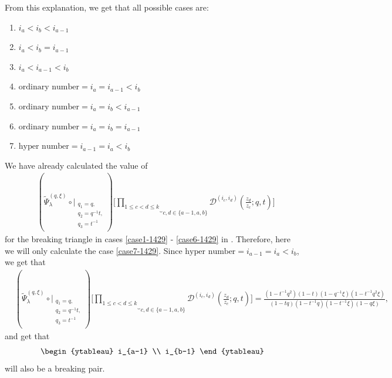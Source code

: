 \documentclass[12pt,reqno,a4paper]{amsart}
\newcommand{\comp}{\circ}
\newcommand{\cals}[1]{\mathcal{#1}}
\numberwithin{equation}{section}
\newcommand{\dualmap}{
\widetilde{\Psi}^{(q,\xi)}_{\lambda}
}
\theoremstyle{definition}
\begin{document}
From this explanation, we get that all possible cases are:
\begin{enumerate}[(1)]
	\item \label{case1-1429}$i_a < i_b < i_{a-1}$
	\item  \label{case2-1429} $i_a< i_b = i_{a-1}$
	\item  \label{case3-1429}$i_a < i_{a-1} < i_b$
	\item  \label{case4-1429}$\text{ordinary number} = i_a = i_{a-1} < i_b$
	\item  \label{case5-1429}$\text{ordinary number} = i_a = i_b < i_{a-1}$
	\item  \label{case6-1429}$\text{ordinary number} = i_a = i_b = i_{a-1}$
	\item \label{case7-1429} $\text{hyper number} = i_{a-1} = i_a < i_b$
\end{enumerate}
We have already calculated the value of 
\begin{align}
	&(
	\dualmap
	\comp 
	\bigg|_{
		\substack{
			q_1 = q, \\
			q_2 = q^{-1}t,\\
			q_3 = t^{-1} \\
		}
	}
	)
	\Bigg[
	\underbrace{		\prod_{1 \leq c < d \leq k}			}_{c,d \in \{a-1,a,b\}}
	\cals{D}^{(i_c,i_d)}\left(
	\frac{z_d}{z_c}
	; q, t
	\right)
	\Bigg]
\end{align}
for the breaking triangle in cases \ref{case1-1429} - \ref{case6-1429} in \cite{CSW2025}. Therefore, here we will only calculate the case \ref{case7-1429}. Since $\text{hyper number} = i_{a-1} = i_a < i_b$, we get that 
\begin{align}
	&(
	\dualmap
	\comp 
	\bigg|_{
		\substack{
			q_1 = q, \\
			q_2 = q^{-1}t,\\
			q_3 = t^{-1} \\
		}
	}
	)
	\Bigg[
	\underbrace{		\prod_{1 \leq c < d \leq k}			}_{c,d \in \{a-1,a,b\}}
	\cals{D}^{(i_c,i_d)}\left(
	\frac{z_d}{z_c}
	; q, t
	\right)
	\Bigg]
	= 
	\frac{
		(1 - t^{-1}q^2)(1 - t)(1 - q^{-1}\xi)(1 - t^{-1}q^2\xi)
	}{
		(1 - tq)(1 - t^{-1}q)(1 - t^{-1}\xi)(1 - q\xi)
	},
\label{eqn-a-21-1814-27jul}
\end{align}
and get that 
\begin{align}
	\begin{ytableau}
		i_{a-1}
		\\
		i_{b-1}
	\end{ytableau} 
\label{eqn-a-22-1814-27jul}
\end{align}
will also be a breaking pair. 
\end{document}
